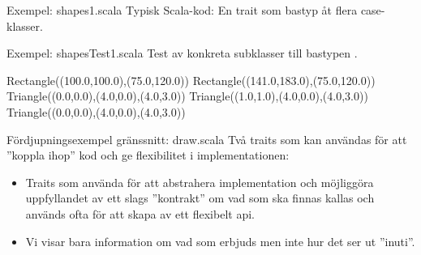 



\begin{Slide}{Exempel: shapes1.scala}
Typisk Scala-kod: En trait som bastyp åt flera case-klasser.
\end{Slide}

\begin{Slide}{Exempel: shapesTest1.scala}
Test av konkreta subklasser till bastypen .

\begin{REPL}
Rectangle((100.0,100.0),(75.0,120.0))
Rectangle((141.0,183.0),(75.0,120.0))
Triangle((0.0,0.0),(4.0,0.0),(4.0,3.0))
Triangle((1.0,1.0),(4.0,0.0),(4.0,3.0))
Triangle((0.0,0.0),(4.0,0.0),(4.0,3.0))
\end{REPL}
\end{Slide}


\begin{Slide}{Fördjupningsexempel gränssnitt: draw.scala}
Två traits som kan användas för att ''koppla ihop'' kod och ge flexibilitet i implementationen:

\pause
\setlength{\leftmargini}{0pt}
\begin{itemize}\SlideFontSmall
\item  Traits som använda för att abstrahera implementation och möjliggöra uppfyllandet av ett slags ''kontrakt'' om vad som ska finnas kallas   och används ofta för att skapa av ett flexibelt api.


\item Vi visar bara information om vad som erbjuds men inte hur det ser ut ''inuti''.

\end{itemize}
\end{Slide}

